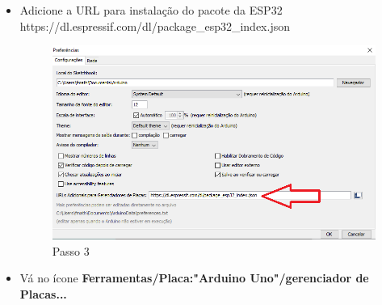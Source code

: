 \begin{itemize}
\item Adicione a URL para instalação do pacote da ESP32 \\https://dl.espressif.com/dl/package_esp32_index.json

   \begin{figure}[H]
  \centering
  \includegraphics[scale=0.4]{Figuras/passo3.png}
  \caption{Passo 3}
  \label{fig:Download ide}
\end{figure}

\item Vá no ícone \textbf{ Ferramentas/Placa:"Arduino Uno"/gerenciador de Placas...}


\end{itemize}
